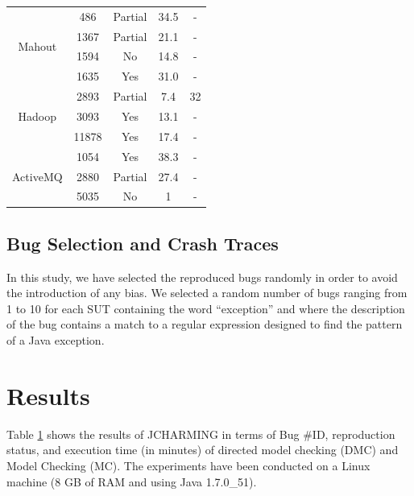 \documentclass[times, doublespace]{smrauth}
\begin{document}
{\begin{table}
\begin{tabular}{c|c|c|c|c}
\multirow{4}{*}{Mahout}   & 486      & Partial & 34.5     & -        \\
                            & 1367     & Partial & 21.1     & -       \\
                            & 1594 	   & No 	 & 14.8 	    & -       \\
                            & 1635     & Yes     & 31.0     & - \\ \hline
\multirow{3}{*}{Hadoop}     & 2893     & Partial & 7.4      & 32       \\
						    & 3093     & Yes 	 & 13.1     & -        \\
                            & 11878    & Yes 	 & 17.4     & - \\  \hline
\multirow{3}{*}{ActiveMQ}   & 1054     & Yes     & 38.3     & -      \\
						    & 2880     & Partial & 27.4        & -        \\
                            & 5035     & No 	 & 1    & - \\  \hline \hline
\end{tabular}


\label{tab:jcharming-results}
\end{table}


\subsection{Bug Selection and Crash Traces}

In this study, we have selected the reproduced bugs randomly
in order to avoid the introduction of any bias. We selected a
random number of bugs ranging from 1 to 10 for each SUT containing the word ``exception'' and where the description of
the bug contains a match to a regular expression designed to find the pattern of a
Java exception.

\section{Results\label{sec:results}}

Table \ref{tab:jcharming-results} shows the results of JCHARMING in terms of Bug
\#ID, reproduction status, and execution time (in minutes) of
directed model checking (DMC) and Model Checking (MC).
The experiments have been conducted on a Linux machine (8
GB of RAM and using Java 1.7.0\_51).

}
\end{document}
